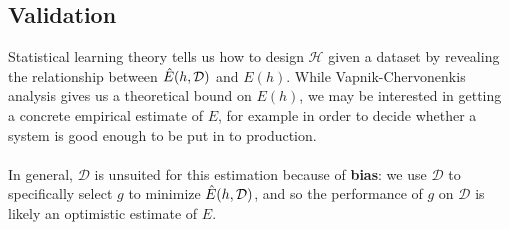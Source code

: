 \subsection{Validation}
\label{validation}
Statistical learning theory tells us how to design $\mathcal{H}$ given a dataset by revealing the relationship between $\hat{E}(h, \mathcal{D})$ and $E(h)$. While Vapnik-Chervonenkis analysis gives us a theoretical bound on $E(h)$, we may be interested in getting a concrete empirical estimate of $E$, for example in order to decide whether a system is good enough to be put in to production.
\\\\
In general, $\mathcal{D}$ is unsuited for this estimation because of \textbf{bias}: we use $\mathcal{D}$ to specifically select $g$ to minimize $\hat{E}(h, \mathcal{D})$, and so the performance of $g$ on $\mathcal{D}$ is likely an optimistic estimate of $E$.

